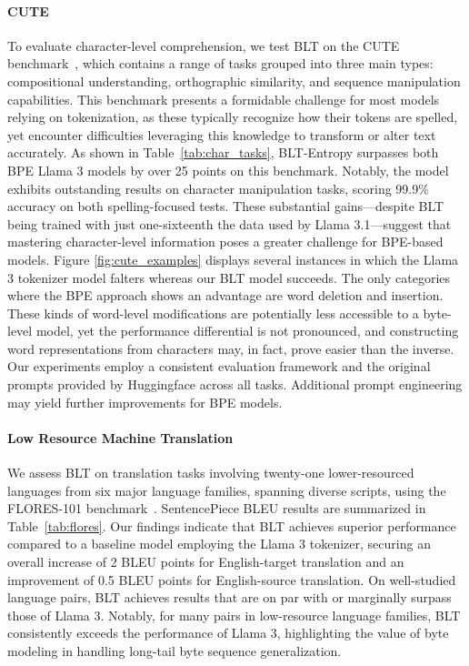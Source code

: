 \paragraph{CUTE}
To evaluate character-level comprehension, we test {\textsc BLT} on the CUTE benchmark~\citep{edman2024cute}, which contains a range of tasks grouped into three main types: compositional understanding, orthographic similarity, and sequence manipulation capabilities. This benchmark presents a formidable challenge for most models relying on tokenization, as these typically recognize how their tokens are spelled, yet encounter difficulties leveraging this knowledge to transform or alter text accurately. As shown in Table~\ref{tab:char_tasks}, {\textsc BLT}-Entropy surpasses both BPE Llama 3 models by over 25 points on this benchmark. Notably, the model exhibits outstanding results on character manipulation tasks, scoring 99.9\% accuracy on both spelling-focused tests. These substantial gains—despite {\textsc BLT} being trained with just one-sixteenth the data used by Llama 3.1—suggest that mastering character-level information poses a greater challenge for BPE-based models. Figure \ref{fig:cute_examples} displays several instances in which the Llama 3 tokenizer model falters whereas our {\textsc BLT} model succeeds. The only categories where the BPE approach shows an advantage are word deletion and insertion. These kinds of word-level modifications are potentially less accessible to a byte-level model, yet the performance differential is not pronounced, and constructing word representations from characters may, in fact, prove easier than the inverse. Our experiments employ a consistent evaluation framework and the original prompts provided by Huggingface across all tasks. Additional prompt engineering may yield further improvements for BPE models.

\paragraph{Low Resource Machine Translation} We assess {\textsc BLT} on translation tasks involving twenty-one lower-resourced languages from six major language families, spanning diverse scripts, using the FLORES-101 benchmark~\citep{goyal2022flores}. SentencePiece BLEU results are summarized in Table~\ref{tab:flores}. Our findings indicate that {\textsc BLT} achieves superior performance compared to a baseline model employing the Llama 3 tokenizer, securing an overall increase of 2 BLEU points for English-target translation and an improvement of 0.5 BLEU points for English-source translation. On well-studied language pairs, {\textsc BLT} achieves results that are on par with or marginally surpass those of Llama 3. Notably, for many pairs in low-resource language families, {\textsc BLT} consistently exceeds the performance of Llama 3, highlighting the value of byte modeling in handling long-tail byte sequence generalization.

